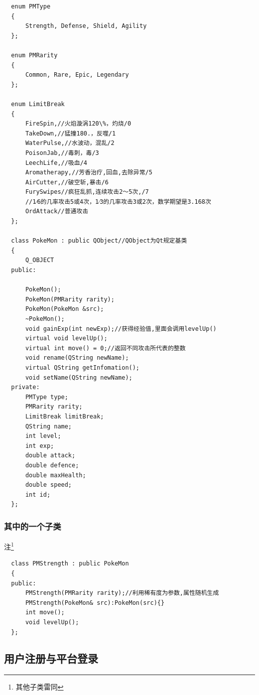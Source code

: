 \documentclass{article}
\begin{document}
    \begin{verbatim}
  enum PMType
  {
      Strength, Defense, Shield, Agility
  };

  enum PMRarity
  {
      Common, Rare, Epic, Legendary
  };
 
  enum LimitBreak
  {
      FireSpin,//火焰漩涡120\%，灼烧/0
      TakeDown,//猛撞180.，反噬/1
      WaterPulse,//水波动，混乱/2
      PoisonJab,//毒刺，毒/3
      LeechLife,//吸血/4
      Aromatherapy,//芳香治疗,回血,去除异常/5
      AirCutter,//破空斩,暴击/6
      FurySwipes//疯狂乱抓,连续攻击2～5次,/7
      //1⁄6的几率攻击5或4次，1⁄3的几率攻击3或2次，数学期望是3.168次
      OrdAttack//普通攻击
  };

  class PokeMon : public QObject//QObject为Qt规定基类
  {
      Q_OBJECT
  public:
 
      PokeMon();
      PokeMon(PMRarity rarity);
      PokeMon(PokeMon &src);
      ~PokeMon();
      void gainExp(int newExp);//获得经验值,里面会调用levelUp()
      virtual void levelUp();
      virtual int move() = 0;//返回不同攻击所代表的整数
      void rename(QString newName);
      virtual QString getInfomation();
      void setName(QString newName);
  private:
      PMType type;
      PMRarity rarity;
      LimitBreak limitBreak;
      QString name;
      int level;
      int exp;
      double attack;
      double defence;
      double maxHealth;
      double speed;
      int id;
  };
\end{verbatim}

\subsubsection{其中的一个子类}
注\footnote{其他子类雷同}
  \begin{verbatim}
  class PMStrength : public PokeMon
  {
  public:
      PMStrength(PMRarity rarity);//利用稀有度为参数,属性随机生成
      PMStrength(PokeMon& src):PokeMon(src){}
      int move();
      void levelUp();
  };
  \end{verbatim}

  \subsection{用户注册与平台登录}
\end{document}
